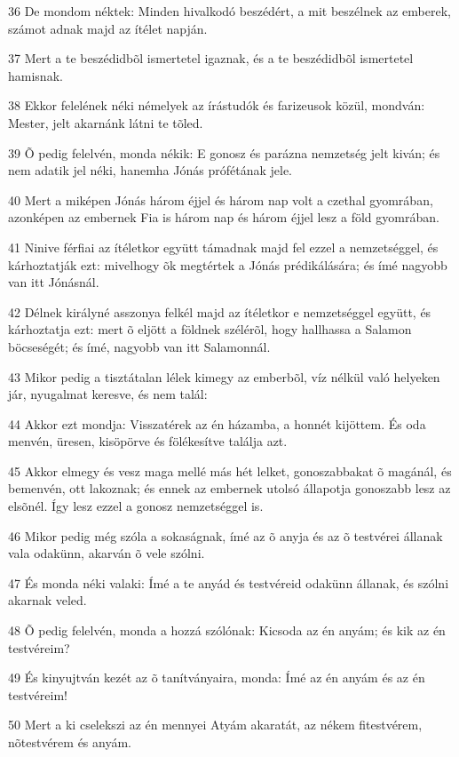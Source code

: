 \par 36 De mondom néktek: Minden hivalkodó beszédért, a mit beszélnek az emberek, számot adnak majd az ítélet napján.
\par 37 Mert a te beszédidbõl ismertetel igaznak, és a te beszédidbõl ismertetel hamisnak.
\par 38 Ekkor felelének néki némelyek az írástudók és farizeusok közül, mondván: Mester, jelt akarnánk látni te tõled.
\par 39 Õ pedig felelvén, monda nékik: E gonosz és parázna nemzetség jelt kiván; és nem adatik jel néki, hanemha Jónás prófétának jele.
\par 40 Mert a miképen Jónás három éjjel és három nap volt a czethal gyomrában, azonképen az embernek Fia is három nap és három éjjel lesz a föld gyomrában.
\par 41 Ninive férfiai az ítéletkor együtt támadnak majd fel ezzel a nemzetséggel, és kárhoztatják ezt: mivelhogy õk megtértek a Jónás prédikálására; és ímé nagyobb van itt Jónásnál.
\par 42 Délnek királyné asszonya felkél majd az ítéletkor e nemzetséggel együtt, és kárhoztatja ezt: mert õ eljött a földnek szélérõl, hogy hallhassa a Salamon böcseségét; és ímé, nagyobb van itt Salamonnál.
\par 43 Mikor pedig a tisztátalan lélek kimegy az emberbõl, víz nélkül való helyeken jár, nyugalmat keresve, és nem talál:
\par 44 Akkor ezt mondja: Visszatérek az én házamba, a honnét kijöttem. És oda menvén, üresen, kisöpörve és fölékesítve találja azt.
\par 45 Akkor elmegy és vesz maga mellé más hét lelket, gonoszabbakat õ magánál, és bemenvén, ott lakoznak; és ennek az embernek utolsó állapotja gonoszabb lesz az elsõnél. Így lesz ezzel a gonosz nemzetséggel is.
\par 46 Mikor pedig még szóla a sokaságnak, ímé az õ anyja és az õ testvérei állanak vala odakünn, akarván õ vele szólni.
\par 47 És monda néki valaki: Ímé a te anyád és testvéreid odakünn állanak, és szólni akarnak veled.
\par 48 Õ pedig felelvén, monda a hozzá szólónak: Kicsoda az én anyám; és kik az én testvéreim?
\par 49 És kinyujtván kezét az õ tanítványaira, monda: Ímé az én anyám és az én testvéreim!
\par 50 Mert a ki cselekszi az én mennyei Atyám akaratát, az nékem fitestvérem, nõtestvérem és anyám.

